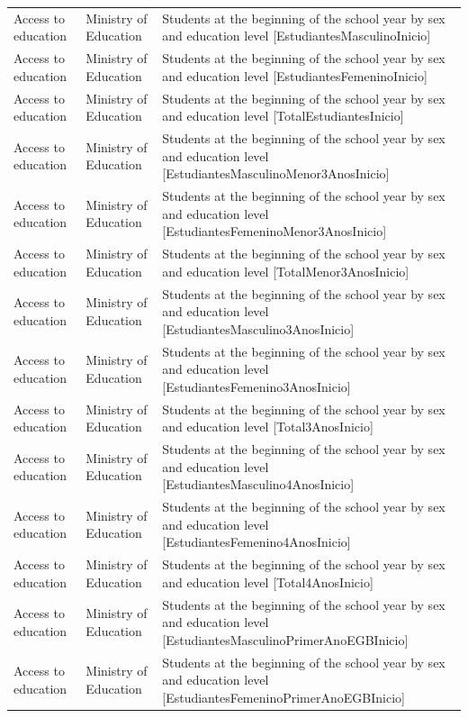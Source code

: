 \documentclass[10pt,a4paper]{article}
\begin{document}
\begin{longtable}{@{}>{\raggedright\arraybackslash}p{3.5cm}>{\raggedright\arraybackslash}p{5.6cm}>{\raggedright\arraybackslash}p{\dimexpr\textwidth-9.1cm-4\tabcolsep\relax}@{}}
Access to education & Ministry of Education & Students at the beginning of the school year by sex and education level [EstudiantesMasculinoInicio]\\
Access to education & Ministry of Education & Students at the beginning of the school year by sex and education level [EstudiantesFemeninoInicio]\\
Access to education & Ministry of Education & Students at the beginning of the school year by sex and education level [TotalEstudiantesInicio]\\
Access to education & Ministry of Education & Students at the beginning of the school year by sex and education level [EstudiantesMasculinoMenor3AnosInicio]\\
Access to education & Ministry of Education & Students at the beginning of the school year by sex and education level [EstudiantesFemeninoMenor3AnosInicio]\\
Access to education & Ministry of Education & Students at the beginning of the school year by sex and education level [TotalMenor3AnosInicio]\\
Access to education & Ministry of Education & Students at the beginning of the school year by sex and education level [EstudiantesMasculino3AnosInicio]\\
Access to education & Ministry of Education & Students at the beginning of the school year by sex and education level [EstudiantesFemenino3AnosInicio]\\
Access to education & Ministry of Education & Students at the beginning of the school year by sex and education level [Total3AnosInicio]\\
Access to education & Ministry of Education & Students at the beginning of the school year by sex and education level [EstudiantesMasculino4AnosInicio]\\
Access to education & Ministry of Education & Students at the beginning of the school year by sex and education level [EstudiantesFemenino4AnosInicio]\\
Access to education & Ministry of Education & Students at the beginning of the school year by sex and education level [Total4AnosInicio]\\
Access to education & Ministry of Education & Students at the beginning of the school year by sex and education level [EstudiantesMasculinoPrimerAnoEGBInicio]\\
Access to education & Ministry of Education & Students at the beginning of the school year by sex and education level [EstudiantesFemeninoPrimerAnoEGBInicio]\\

\end{longtable}
\end{document}
